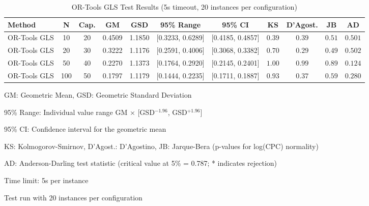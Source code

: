 \begin{table*}[htbp]
\centering
\caption{OR-Tools GLS Test Results (5s timeout, 20 instances per configuration)}
\label{tab:ortools-gls-5s}
\begin{tabular}{@{}l c c S[table-format=1.4] S[table-format=1.4] c c c c c c@{}}
\toprule
\textbf{Method} & \textbf{N} & \textbf{Cap.} & {\textbf{GM}} & {\textbf{GSD}} & 
\textbf{95\% Range} & \textbf{95\% CI} & \textbf{KS} & \textbf{D'Agost.} & \textbf{JB} & \textbf{AD} \\
\midrule
OR-Tools GLS & 10 & 20 & 0.4509 & 1.1850 & [0.3233, 0.6289] & [0.4185, 0.4857] & $0.39$ & $0.39$ & $0.51$ & $0.501$ \\
OR-Tools GLS & 20 & 30 & 0.3222 & 1.1176 & [0.2591, 0.4006] & [0.3068, 0.3382] & $0.70$ & $0.29$ & $0.49$ & $0.502$ \\
OR-Tools GLS & 50 & 40 & 0.2270 & 1.1373 & [0.1764, 0.2920] & [0.2145, 0.2401] & $1.00$ & $0.99$ & $0.89$ & $0.124$ \\
OR-Tools GLS & 100 & 50 & 0.1797 & 1.1179 & [0.1444, 0.2235] & [0.1711, 0.1887] & $0.93$ & $0.37$ & $0.59$ & $0.280$ \\
\bottomrule
\end{tabular}
\begin{tablenotes}
\small
\item GM: Geometric Mean, GSD: Geometric Standard Deviation
\item 95\% Range: Individual value range GM $\times$ [GSD$^{-1.96}$, GSD$^{+1.96}$]
\item 95\% CI: Confidence interval for the geometric mean
\item KS: Kolmogorov-Smirnov, D'Agost.: D'Agostino, JB: Jarque-Bera (p-values for log(CPC) normality)
\item AD: Anderson-Darling test statistic (critical value at 5\% = 0.787; * indicates rejection)
\item Time limit: 5s per instance
\item Test run with 20 instances per configuration
\end{tablenotes}
\end{table*}